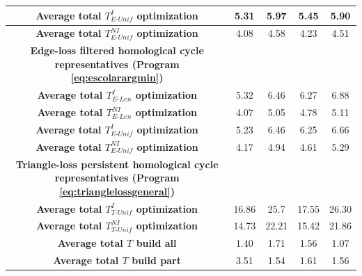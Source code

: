 \documentclass[utf8]{formatting_stuff/frontiersFPHY}
\newcommand{\NI}{^{NI}}
\newcommand{\I}{^I}
\newcommand{\pr}{Program }
\newcommand{\EU}{_{E\text{-}Unif}}
\newcommand{\EL}{_{E\text{-}Len}}
\newcommand{\TU}{_{T\text{-}Unif}}
\theoremstyle{plain}
\theoremstyle{definition}
\begin{document}
\begin{table}[!h]
\begin{tabular}{ |c || c |c |c |c |}
 \textbf{Average total $T\I\EU$ optimization} & 5.31 & 5.97 & 5.45 & 5.90 \\ \hline
 \textbf{Average total $T\NI\EU$ optimization} & 4.08 & 4.58 & 4.23 & 4.51 \\ 
 [0.5ex] 
\hline
\multicolumn{1}{c}{\textbf{Edge-loss filtered homological cycle representatives (\pr \eqref{eq:escolarargmin})}} && \\
\hline
 \textbf{Average total $T\I\EL$ optimization} &5.32 & 6.46 & 6.27 & 6.88 \\ \hline
 \textbf{Average total $T\NI\EL$ optimization} & 4.07 & 5.05 & 4.78 &5.11 \\ \hline 
 \textbf{Average total $T\I\EU$ optimization} &5.23 & 6.46 & 6.25 & 6.66\\ \hline
 \textbf{Average total $T\NI\EU$ optimization} & 4.17 & 4.94 & 4.61 & 5.29\\ 
[0.5ex] 
\hline
\multicolumn{1}{c}{\textbf{Triangle-loss persistent homological cycle representatives (\pr \eqref{eq:trianglelossgeneral})}} &&& \\
\hline
 \textbf{Average total $T\I\TU$ optimization} &16.86 & 25.7 &17.55 & 26.30\\ 
 \hline
 \textbf{Average total $T\NI\TU$ optimization} &  14.73 & 22.21 & 15.42 & 21.86 \\ 
 \hline
   \textbf{Average total $T$ build all} & 1.40 & 1.71 &  1.56 & 1.07 \\ 
  \hline
  \textbf{Average total $T$ build part } & 3.51 & 1.54 &    1.61 & 1.56 \\ 
 \hline
 
\end{tabular}
\label{tab:distributiondata}  
\end{table}



 
\end{document}
